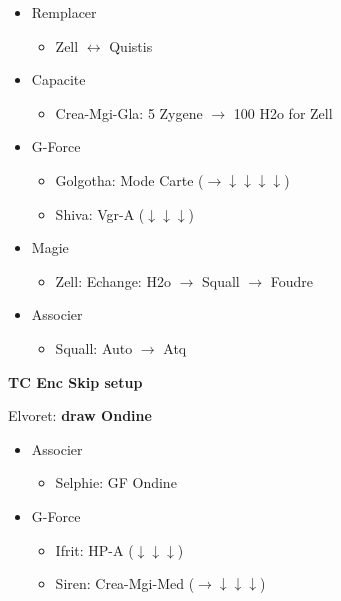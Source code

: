\begin{menu}
	\begin{itemize}
		\item Remplacer
			\begin{itemize}
				\item Zell $\leftrightarrow$ Quistis
			\end{itemize}
		\item Capacite
			\begin{itemize}
				\item Crea-Mgi-Gla: 5 Zygene $\rightarrow$ 100 H2o for Zell
			\end{itemize}
		\item G-Force
			\begin{itemize}
				\item Golgotha: Mode Carte ($\rightarrow\downarrow\downarrow\downarrow\downarrow$)
				\item Shiva: Vgr-A ($\downarrow\downarrow\downarrow$)
			\end{itemize}
		\item Magie
			\begin{itemize}
				\item Zell: Echange: H2o $\rightarrow$ Squall $\rightarrow$ Foudre
			\end{itemize}
		\item Associer
			\begin{itemize}
				\item Squall: Auto $\rightarrow$ Atq
			\end{itemize}
	\end{itemize}
\end{menu}

\textbf{TC Enc Skip setup}

Elvoret: \textbf{draw Ondine}

\begin{menu}
	\begin{itemize}
		\item Associer
			\begin{itemize}
				\item Selphie: GF Ondine
			\end{itemize}
		\item G-Force
			\begin{itemize}
				\item Ifrit: HP-A ($\downarrow\downarrow\downarrow$)
				\item Siren: Crea-Mgi-Med ($\rightarrow\downarrow\downarrow\downarrow$)
			\end{itemize}
	\end{itemize}
\end{menu}

